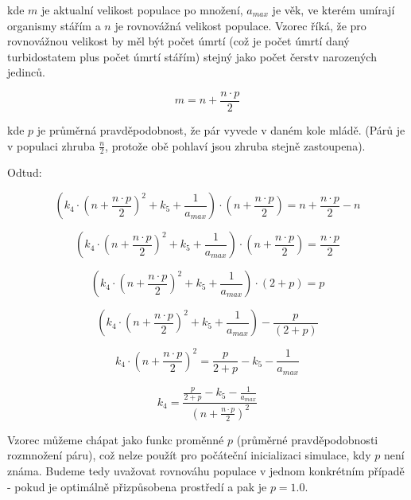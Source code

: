 kde $m$ je aktualní velikost populace po množení, $a_{max}$ je věk, ve kterém umírají organismy stářím a $n$ je rovnovážná
velikost populace. Vzorec říká, že pro rovnovážnou velikost by měl být počet úmrtí (což je počet úmrtí daný
turbidostatem plus počet úmrtí stářím) stejný jako počet čerstv narozených jedinců.

\begin{equation}
m = n + \frac{n\cdot{}p}{2}
\end{equation}

kde $p$ je průměrná pravděpodobnost, že pár vyvede v daném kole mládě. (Párů je v populaci zhruba $\frac{n}{2}$, protože
obě pohlaví jsou zhruba stejně zastoupena).


Odtud:

\begin{equation}
(k_4\cdot{(n + \frac{n\cdot{}p}{2})^2} + {k_5} + \frac{1}{a_{max}})\cdot{(n + \frac{n\cdot{}p}{2})}
        = n + \frac{n\cdot{}p}{2}  - n
\end{equation}

\begin{equation}
(k_4\cdot{(n + \frac{n\cdot{}p}{2})^2} + {k_5} + \frac{1}{a_{max}})\cdot{(n + \frac{n\cdot{}p}{2})} = \frac{n\cdot{}p}{2}
\end{equation}

\begin{equation}
(k_4\cdot{(n + \frac{n\cdot{}p}{2})^2} + {k_5} + \frac{1}{a_{max}})\cdot{(2 + p)} = p
\end{equation}


\begin{equation}
(k_4\cdot{(n + \frac{n\cdot{}p}{2})^2} + {k_5} + \frac{1}{a_{max}}) - \frac{p}{(2 + p)}
\end{equation}

\begin{equation}
k_4\cdot{(n + \frac{n\cdot{}p}{2})^2} = \frac{p}{2 + p} -  {k_5} - \frac{1}{a_{max}}
\end{equation}

\begin{equation}
k_4  = \frac{\frac{p}{2 + p} -  {k_5} - \frac{1}{a_{max}}}{(n + \frac{n\cdot{}p}{2})^2}
\end{equation}


Vzorec můžeme chápat jako funkc proměnné $p$ (průměrné pravděpodobnosti rozmnožení páru), což nelze použít  pro
počáteční inicializaci simulace, kdy $p$ není známa. Budeme tedy uvažovat rovnováhu populace v jednom konkrétním
případě - pokud je optimálně přizpůsobena prostředí a pak je $p = 1.0$.

